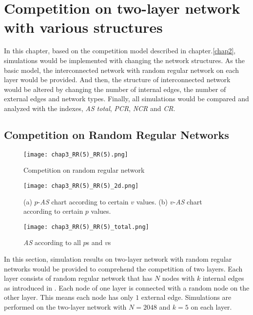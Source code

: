 

\chapter{Competition on two-layer network with various structures}
\label{chap3}
In this chapter, based on the competition model described in chapter.\ref{chap2}, simulations would be implemented with changing the network structures. As the basic model, the interconnected network with random regular network on each layer would be provided. And then, the structure of interconnected network would be altered by changing the number of internal edges, the number of external edges and network types. Finally, all simulations would be compared and analyzed with the indexes, \textit{AS total}, \textit{PCR}, \textit{NCR} and \textit{CR}.\\

\section{Competition on Random Regular Networks}
\label{competition on Random Regular Networks}
\begin{figure}[!htb]
	\centering
	\texttt{[image: chap3\_RR(5)\_RR(5).png]}
	\caption{Competition on random regular network}
	\label{chap3_RR(5)_RR(5)}
\end{figure}
\begin{figure}[!htb]
	\centering
	\texttt{[image: chap3\_RR(5)\_RR(5)\_2d.png]}
	\caption{(a) $p$-\textit{AS} chart according to certain $v$ values. (b) $v$-\textit{AS} chart according to certain $p$ values.}
	\label{chap3_RR(5)_RR(5)_2d}
\end{figure}
\begin{figure}[!htb]
	\centering
	\texttt{[image: chap3\_RR(5)\_RR(5)\_total.png]}
	\caption{\textit{AS} according to all $p$s and $v$s}
	\label{chap3_RR(5)_RR(5)_total}
\end{figure}
In this section, simulation results on two-layer network with random regular networks would be provided to comprehend the competition of two layers. Each layer consists of random regular network that has $N$ nodes with $k$ internal edges as introduced in \parencite{kimsangwoo2012, choi2011, bela2001}. Each node of one layer is connected with a random node on the other layer. This means each node has only $1$ external edge. Simulations are performed on the two-layer network with $N=2048$ and $k=5$ on each layer.

